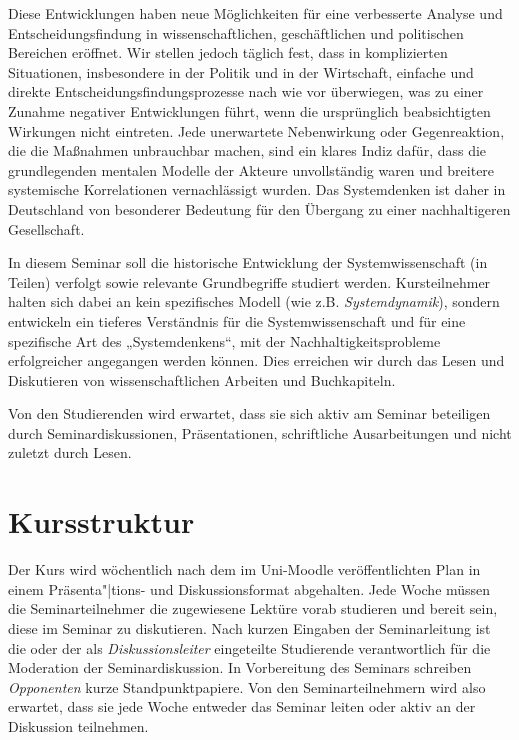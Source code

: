 \documentclass[11pt,a4paper]{article}
\begin{document}
Diese Entwicklungen haben neue Möglichkeiten für eine verbesserte Analyse und
Entscheidungsfindung in wissenschaftlichen, geschäftlichen und politischen
Bereichen eröffnet. Wir stellen jedoch täglich fest, dass in komplizierten
Situationen, insbesondere in der Politik und in der Wirtschaft, einfache und
direkte Entscheidungsfindungsprozesse nach wie vor überwiegen, was zu einer
Zunahme negativer Entwicklungen führt, wenn die ursprünglich beabsichtigten
Wirkungen nicht eintreten. Jede unerwartete Nebenwirkung oder Gegenreaktion,
die die Maßnahmen unbrauchbar machen, sind ein klares Indiz dafür, dass die
grundlegenden mentalen Modelle der Akteure unvollständig waren und breitere
systemische Korrelationen vernachlässigt wurden. Das Systemdenken ist daher in
Deutschland von besonderer Bedeutung für den Übergang zu einer nachhaltigeren
Gesellschaft.

In diesem Seminar soll die historische Entwicklung der Systemwissenschaft (in
Teilen) verfolgt sowie relevante Grundbegriffe studiert werden. Kursteilnehmer
halten sich dabei an kein spezifisches Modell (wie z.B. \emph{Systemdynamik}),
sondern entwickeln ein tieferes Verständnis für die Systemwissenschaft und für
eine spezifische Art des „Systemdenkens“, mit der Nachhaltigkeitsprobleme
erfolgreicher angegangen werden können. Dies erreichen wir durch das Lesen und
Diskutieren von wissenschaftlichen Arbeiten und Buchkapiteln.

Von den Studierenden wird erwartet, dass sie sich aktiv am Seminar beteiligen
durch Seminardiskussionen, Präsentationen, schriftliche Ausarbeitungen und
nicht zuletzt durch Lesen.

\section{Kursstruktur}

Der Kurs wird wöchentlich nach dem im Uni-Moodle veröffentlichten Plan in
einem Präsenta"|tions- und Diskussionsformat abgehalten.  Jede Woche müssen
die Seminarteilnehmer die zugewiesene Lektüre vorab studieren und bereit sein,
diese im Seminar zu diskutieren. Nach kurzen Eingaben der Seminarleitung ist
die oder der als \emph{Diskussionsleiter} eingeteilte Studierende
verantwortlich für die Moderation der Seminardiskussion. In Vorbereitung des
Seminars schreiben \emph{Opponenten} kurze Standpunktpapiere.  Von den
Seminarteilnehmern wird also erwartet, dass sie jede Woche entweder das
Seminar leiten oder aktiv an der Diskussion teilnehmen.
\end{document}
